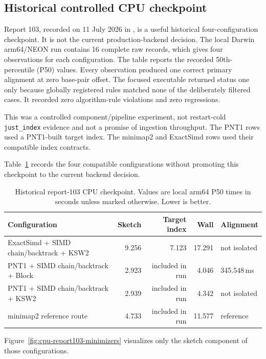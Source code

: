 \subsection{Historical controlled CPU checkpoint}

Report 103, recorded on 11 July 2026 in
\allowbreak
{}\allowbreak
{},
is a useful historical four-configuration checkpoint. It is not the current
production-backend decision. The local Darwin arm64/NEON run contains 16
complete raw records, which gives four observations for each configuration.
The table reports the recorded 50th-percentile (P50) values. Every observation
produced one correct primary alignment at zero base-pair offset. The focused executable
returned status one only because globally registered rules matched none of the
deliberately filtered cases. It recorded zero algorithm-rule violations and
zero regressions.

This was a controlled component/pipeline experiment, not restart-cold
\texttt{just\_index} evidence and not a promise of ingestion throughput. The
PNT1 rows used a PNT1-built target index. The minimap2 and ExactSimd rows used
their compatible index contracts.

Table~\ref{tab:cpu-report103-minimizers} records the four compatible
configurations without promoting this checkpoint to the current backend
decision.

\begin{table}[htbp]
\centering
\caption{Historical report-103 CPU checkpoint. Values are local arm64 P50
times in seconds unless marked otherwise. Lower is better.}
\label{tab:cpu-report103-minimizers}
\small
\begin{tabular}{lrrrl}
\toprule
Configuration & Sketch & Target index & Wall & Alignment \\
\midrule
ExactSimd + SIMD chain/backtrack + KSW2 & 9.256 & 7.123 & 17.291 &
not isolated \\
PNT1 + SIMD chain/backtrack + Block & 2.923 & included in run & 4.046 &
345.548\,ms \\
PNT1 + SIMD chain/backtrack + KSW2 & 2.939 & included in run & 4.342 &
not isolated \\
minimap2 reference route & 4.733 & included in run & 11.577 &
reference \\
\bottomrule
\end{tabular}
\end{table}

Figure~\ref{fig:cpu-report103-minimizers} visualizes only the sketch component
of those configurations.

